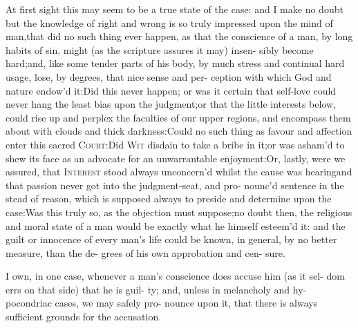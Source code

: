 \documentclass{article}
\begin{document}
\lqq At first sight this may seem to be a\break
\lqq true state of the case: and I make no\break
\lqq doubt but the knowledge of right and\break
\lqq wrong is so truly impressed upon the\break
\lqq mind of man,\tsk that did no such thing\break
\lqq ever happen, as that the conscience of\break
\lqq a man, by long habits of sin, might\break
\lqq (as the scripture assures it may) insen-\break
\lqq sibly become hard;\tsk and, like some\break
\lqq tender parts of his body, by much\break
\lqq stress and continual hard usage, lose,\break
\lqq by degrees, that nice sense and per-\break
\lqq ception with which God and nature\break 
\lqq endow’d it:\tsk Did this never happen;\break
\lqq \tsk or was it certain that self-love could\break
\lqq never hang the least bias upon the\break 
\lqq judgment;\tsk or that the little interests\break 
\lqq below, could rise up and perplex the\break
\lqq faculties of our upper regions, and
\lqq encompass them about with clouds and\break
\lqq thick darkness:\tsh Could no such\break
\lqq thing as favour and affection enter this\break
\lqq sacred \textsc{Court}:\tsk  Did \textsc{Wit} disdain to\break
\lqq take a bribe in it;\tsk or was asham’d to\break
\lqq shew its face as an advocate for an\break
\lqq unwarrantable enjoyment:\tsk Or, lastly,\break
\lqq were we assured, that \textsc{Interest} stood\break
\lqq always unconcern’d whilst the cause\break
\lqq was hearing\tsk and that passion never\break
\lqq got into the judgment-seat, and pro-\break
\lqq nounc’d sentence in the stead of reason,\break
\lqq which is supposed always to preside\break
\lqq and determine upon the case:\tsk Was\break
\lqq this truly so, as the objection must\break
\lqq suppose;\tsk no doubt then, the religious\break
\lqq and moral state of a man would be\break
\lqq exactly what he himself esteem’d it:\tsk\break
\lqq and the guilt or innocence of every\break
\lqq man’s life could be known, in general,\break
\lqq by no better measure, than the de-
\lqq grees of his own approbation and cen-\break
\lqq sure.

\lqq I own, in one case, whenever a man’s\break
\lqq conscience does accuse him (as it sel-\break
\lqq dom errs on that side) that he is guil-\break
\lqq ty; and, unless in melancholy and hy-\break
\lqq pocondriac cases, we may safely pro-\break
\lqq nounce upon it, that there is always\break
\lqq sufficient grounds for the accusation.
\end{document}
